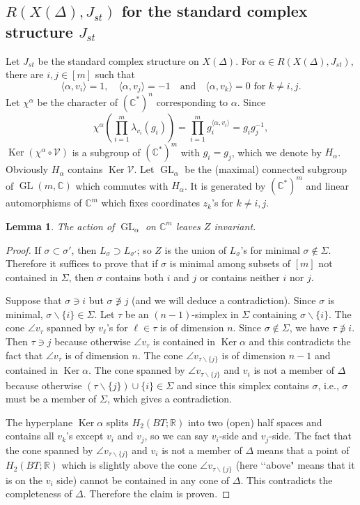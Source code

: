 \documentclass[12pt]{amsart}
\theoremstyle{plain} \numberwithin{equation}{section}
\newtheorem{lemm}[theo]{Lemma}
\theoremstyle{definition}
\def\C{\mathbb C}
\def\R{\mathbb R}
\DeclareMathOperator{\GL}{GL}
\DeclareMathOperator{\Ker}{Ker}
\def\Jst{J_{st}}
\begin{document}
\subsection{$R(X(\Delta),\Jst)$ for the standard complex structure $\Jst$} 
Let $\Jst$ be the standard complex structure on $X(\Delta)$.  For $\alpha\in R(X(\Delta),\Jst)$, there are $i,j\in [m]$ such that 
\[
\langle \alpha,v_i\rangle=1,\quad \langle \alpha,v_j\rangle=-1\quad 
\text{and}\quad \langle\alpha,v_k\rangle=0 \text{ for $k\not=i,j$.}
\]
Let $\chi^\alpha$ be the character of $(\C^*)^n$ corresponding to $\alpha$.  Since 
\[
\chi^\alpha(\prod_{i=1}^m\lambda_{v_i}(g_i))=
\prod_{i=1}^mg_i^{\langle\alpha,v_i\rangle}=g_ig_j^{-1},
\]
$\Ker (\chi^{\alpha}\circ\mathcal V)$ is a subgroup of $(\C^*)^m$ with $g_i=g_j$, which we denote by $H_\alpha$.  Obviously $H_\alpha$ contains $\Ker \mathcal V$. Let $\GL_\alpha$ be the (maximal) connected subgroup of $\GL(m,\C)$ which commutes with $H_\alpha$.  It is generated by $(\C^*)^m$ and linear automorphisms of $\C^m$ which fixes coordinates $z_k$'s for $k\not=i,j$.   

\begin{lemm} \label{lemm:6-1}
The action of $\GL_\alpha$ on $\C^m$ leaves $Z$ invariant. 
\end{lemm}

\begin{proof}
If $\sigma\subset\sigma'$, then $L_\sigma\supset L_{\sigma'}$; so $Z$ is the union of $L_{\sigma}$'s for minimal $\sigma\notin \Sigma$.  Therefore it suffices to prove that if $\sigma$ is minimal among subsets of $[m]$ not contained in $\Sigma$, then $\sigma$ contains both $i$ and $j$ or contains neither $i$ nor $j$.  

Suppose that $\sigma\ni i$ but $\sigma\not\ni j$ (and we will deduce a contradiction).  Since $\sigma$ is minimal, $\sigma\backslash\{i\}\in \Sigma$. Let $\tau$ be an $(n-1)$-simplex in $\Sigma$ containing $\sigma\backslash\{i\}$.  The cone $\angle v_\tau$ spanned by $v_\ell$'s for $\ell \in \tau$ is of dimension $n$. Since $\sigma\notin \Sigma$, we have $\tau\not\ni i$.  Then $\tau\ni j$ because otherwise $\angle v_\tau$ is contained in $\Ker\alpha$ and this contradicts the fact that $\angle v_\tau$ is of dimension $n$. The cone $\angle v_{\tau\backslash\{j\}}$ is of dimension $n-1$ and contained in $\Ker\alpha$.  The cone spanned by $\angle v_{\tau\backslash\{j\}}$ and $v_i$ is not a member of $\Delta$ because otherwise $(\tau\backslash\{j\})\cup\{i\}\in \Sigma$ and since this simplex contains $\sigma$, i.e., $\sigma$ must be a member of $\Sigma$, which gives a contradiction. 

The hyperplane $\Ker\alpha$ splits $H_2(BT;\R)$ into two (open) half spaces and contains all $v_k$'s except $v_i$ and $v_j$, so we can say $v_{i}$-side and $v_{j}$-side. The fact that the cone spanned by $\angle v_{\tau\backslash\{j\}}$ and $v_i$ is not a member of $\Delta$ means that a point of $H_2(BT;\R)$ which is slightly above the cone $\angle v_{\tau\backslash\{j\}}$ (here \lq\lq above" means that it is on the $v_i$ side) cannot be contained in any cone of $\Delta$.  This contradicts the completeness of $\Delta$.  Therefore the claim is proven.   
\end{proof}
\end{document}
